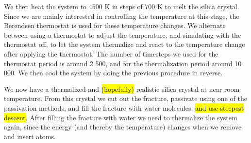 We then heat the system to 4500 K in steps of 700 K to melt the silica crystal. Since we are mainly interested in controlling the temperature at this stage, the Berendsen thermostat is used for these temperature changes. We alternate between using a thermostat to adjust the temperature, and simulating with the thermostat off, to let the system thermalize and react to the temperature change after applying the thermostat. The number of timesteps we used for the thermostat period is around 2 500, and for the thermalization period around 10 000. We then cool the system by doing the previous procedure in reverse. 

We now have a thermalized and \hl{(hopefully)} realistic silica crystal at near room temperature. From this crystal we cut out the fracture, passivate using one of the passivation methods, and fill the fracture with water molecules, \hl{and use steepest descent}. After filling the fracture with water we need to thermalize the system again, since the energy (and thereby the temperature) changes when we remove and insert atoms.

